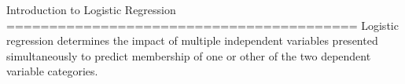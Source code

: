 Introduction to Logistic Regression
=========================================
Logistic regression determines the impact of multiple independent variables
presented simultaneously to predict membership of one or other of the two
dependent variable categories.

